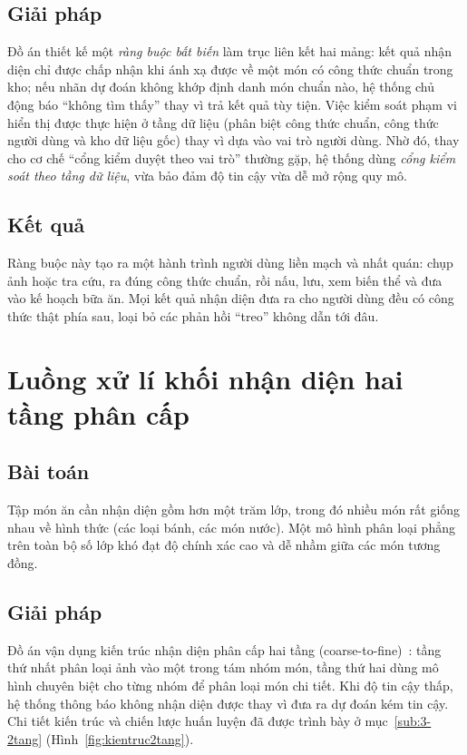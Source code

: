 \documentclass[../DoAn.tex]{subfiles}
\begin{document}
\subsection*{Giải pháp}
Đồ án thiết kế một \emph{ràng buộc bất biến} làm trục liên kết hai mảng: kết quả nhận diện chỉ được chấp nhận khi ánh xạ được về một món có công thức chuẩn trong kho; nếu nhãn dự đoán không khớp định danh món chuẩn nào, hệ thống chủ động báo ``không tìm thấy'' thay vì trả kết quả tùy tiện. Việc kiểm soát phạm vi hiển thị được thực hiện ở tầng dữ liệu (phân biệt công thức chuẩn, công thức người dùng và kho dữ liệu gốc) thay vì dựa vào vai trò người dùng. Nhờ đó, thay cho cơ chế ``cổng kiểm duyệt theo vai trò'' thường gặp, hệ thống dùng \emph{cổng kiểm soát theo tầng dữ liệu}, vừa bảo đảm độ tin cậy vừa dễ mở rộng quy mô.

\subsection*{Kết quả}
Ràng buộc này tạo ra một hành trình người dùng liền mạch và nhất quán: chụp ảnh hoặc tra cứu, ra đúng công thức chuẩn, rồi nấu, lưu, xem biến thể và đưa vào kế hoạch bữa ăn. Mọi kết quả nhận diện đưa ra cho người dùng đều có công thức thật phía sau, loại bỏ các phản hồi ``treo'' không dẫn tới đâu.

\section{Luồng xử lí khối nhận diện hai tầng phân cấp}
\label{sec:5-haitang}

\subsection*{Bài toán}
Tập món ăn cần nhận diện gồm hơn một trăm lớp, trong đó nhiều món rất giống nhau về hình thức (các loại bánh, các món nước). Một mô hình phân loại phẳng trên toàn bộ số lớp khó đạt độ chính xác cao và dễ nhầm giữa các món tương đồng.

\subsection*{Giải pháp}
Đồ án vận dụng kiến trúc nhận diện phân cấp hai tầng (coarse-to-fine)~\cite{yan2015hdcnn, zhu2017bcnn}: tầng thứ nhất phân loại ảnh vào một trong tám nhóm món, tầng thứ hai dùng mô hình chuyên biệt cho từng nhóm để phân loại món chi tiết. Khi độ tin cậy thấp, hệ thống thông báo không nhận diện được thay vì đưa ra dự đoán kém tin cậy. Chi tiết kiến trúc và chiến lược huấn luyện đã được trình bày ở mục~\ref{sub:3-2tang} (Hình~\ref{fig:kientruc2tang}).
\end{document}
